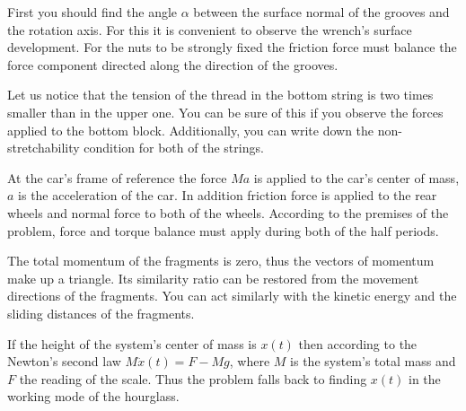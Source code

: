 \documentclass[11pt]{article}
\begin{document}

\hinteng
First you should find the angle $\alpha$ between the surface normal of the grooves and the rotation axis. For this it is convenient to observe the wrench’s surface development. For the nuts to be strongly fixed the friction force must balance the force component directed along the direction of the grooves.
\probend
\bigskip


\hinteng
Let us notice that the tension of the thread in the bottom string is two times smaller than in the upper one. You can be sure of this if you observe the forces applied to the bottom block. Additionally, you can write down the non-stretchability condition for both of the strings.
\probend
\bigskip


\hinteng
At the car’s frame of reference the force $Ma$ is applied to the car’s center of mass, $a$ is the acceleration of the car. In addition friction force is applied to the rear wheels and normal force to both of the wheels. According to the premises of the problem, force and torque balance must apply during both of the half periods.
\probend
\bigskip


\hinteng
The total momentum of the fragments is zero, thus the vectors of momentum make up a triangle. Its similarity ratio can be restored from the movement directions of the fragments. You can act similarly with the kinetic energy and the sliding distances of the fragments.
\probend
\bigskip


\hinteng
If the height of the system’s center of mass is $x(t)$ then according to the Newton’s second law $M\ddot{x}(t) = F - Mg$, where $M$ is the system’s total mass and $F$ the reading of the scale. Thus the problem falls back to finding $x(t)$ in the working mode of the hourglass.
\probend
\bigskip
\end{document}

